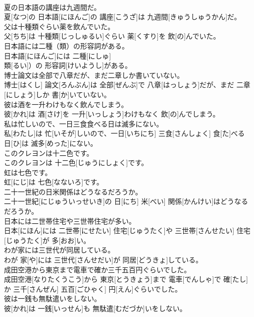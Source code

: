 \documentclass[8pt]{extreport}
\begin{document}
\begin{CJK}{UTF8}{min}
\\	夏の日本語の講座は九週間だ。	
\\	夏[なつ]の 日本語[にほんご]の 講座[こうざ]は 九週間[きゅうしゅうかん]だ。
\\	父は十種類ぐらい薬を飲んでいた。	
\\	父[ちち]は 十種類[じっしゅるい]ぐらい 薬[くすり]を 飲[の]んでいた。
\\	日本語には二種（類）の形容詞がある。	
\\	日本語[にほんご]には 二種[にしゅ]
\\	類[るい]）の 形容詞[けいようし]がある。
\\	博士論文は全部で八章だが、まだ二章しか書いていない。	
\\	博士[はくし] 論文[ろんぶん]は 全部[ぜんぶ]で 八章[はっしょう]だが、まだ 二章[にしょう]しか 書[か]いていない。
\\	彼は酒を一升わけもなく飲んでしまう。	
\\	彼[かれ]は 酒[さけ]を 一升[いっしょう]わけもなく 飲[の]んでしまう。
\\	私は忙しいので、一日三食食べる日は滅多にない。	
\\	私[わたし]は 忙[いそが]しいので、一日[いちにち] 三食[さんしょく] 食[た]べる 日[ひ]は 滅多[めった]にない。
\\	このクレヨンは十二色です。	
\\	このクレヨンは 十二色[じゅうにしょく]です。
\\	虹は七色です。	
\\	虹[にじ]は 七色[なないろ]です。
\\	二十一世紀の日米関係はどうなるだろうか。	
\\	二十一世紀[にじゅういっせいき]の 日[にち] 米[べい] 関係[かんけい]はどうなるだろうか。
\\	日本には二世帯住宅や三世帯住宅が多い。	
\\	日本[にほん]には 二世帯[にせたい] 住宅[じゅうたく]や 三世帯[さんせたい] 住宅[じゅうたく]が 多[おお]い。
\\	わが家には三世代が同居している。	
\\	わが 家[や]には 三世代[さんせだい]が 同居[どうきょ]している。
\\	成田空港から東京まで電車で確か三千五百円ぐらいでした。	
\\	成田空港[なりたくうこう]から 東京[とうきょう]まで 電車[でんしゃ]で 確[たし]か 三千[さんぜん] 五百[ごひゃく] 円[えん]ぐらいでした。
\\	彼は一銭も無駄遣いをしない。	
\\	彼[かれ]は 一銭[いっせん]も 無駄遣[むだづか]いをしない。

\end{CJK}
\end{document}
